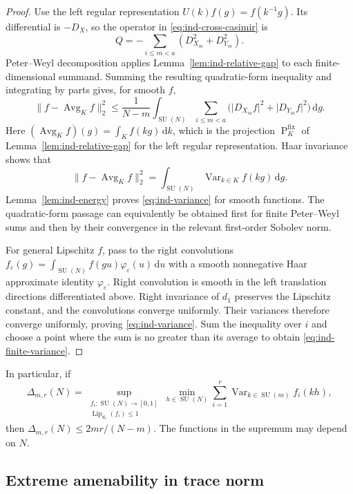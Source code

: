 \begin{proof}
Use the left regular representation $U(k)f(g)=f(k^{-1}g)$.
Its differential is $-D_X$, so the operator in
\eqref{eq:ind-cross-casimir} is
\[
Q=-\sum_{i\le m<a}(D_{X_{ia}}^2+D_{Y_{ia}}^2).
\]
Peter--Weyl decomposition applies Lemma~\ref{lem:ind-relative-gap} to
each finite-dimensional summand. Summing the resulting quadratic-form
inequality and integrating by parts gives, for smooth $f$,
\begin{equation}\label{eq:ind-form-bound}
\lVert f-\operatorname{Avg}_Kf\rVert_2^2\le\frac{1}{N-m}
\int_{\operatorname{SU}(N)}\sum_{i\le m<a}
\bigl(\lvert D_{X_{ia}}f\rvert^2+\lvert D_{Y_{ia}}f\rvert^2\bigr)\,\mathrm d g.
\end{equation}
Here $(\operatorname{Avg}_Kf)(g)=\int_Kf(kg)\,\mathrm d k$, which is the projection
$\operatorname{P}^{\mathrm{fix}}_K$ of Lemma~\ref{lem:ind-relative-gap} for the left regular
representation. Haar invariance shows that
\[
\lVert f-\operatorname{Avg}_Kf\rVert_2^2=\int_{\operatorname{SU}(N)}\operatorname{Var}_{k\in K}f(kg)\,\mathrm d g.
\]
Lemma~\ref{lem:ind-energy} proves \eqref{eq:ind-variance} for smooth functions.
The quadratic-form passage can equivalently be obtained first for
finite Peter--Weyl sums and then by their convergence in the relevant
first-order Sobolev norm.

For general Lipschitz $f$, pass to the right convolutions
$f_\varepsilon(g)=\int_{\operatorname{SU}(N)}f(gu)\varphi_\varepsilon(u)\,\mathrm d u$ with a
smooth nonnegative Haar approximate identity $\varphi_\varepsilon$.
Right convolution is smooth in the left translation directions
differentiated above. Right invariance of $d_1$ preserves the Lipschitz
constant, and the convolutions converge uniformly. Their variances
therefore converge uniformly, proving \eqref{eq:ind-variance}. Sum the
inequality over $i$ and choose a point where the sum is no greater
than its average to obtain \eqref{eq:ind-finite-variance}.
\end{proof}

In particular, if
\[
\Delta_{m,r}(N)=
\sup_{\substack{f_i:\operatorname{SU}(N)\to[0,1]\\\operatorname{Lip}_{d_1}(f_i)\le1}}
\min_{h\in\operatorname{SU}(N)}\sum_{i=1}^r\operatorname{Var}_{k\in\operatorname{SU}(m)}f_i(kh),
\]
then $\Delta_{m,r}(N)\le2mr/(N-m)$. The functions in the supremum
may depend on $N$.


\subsection{Extreme amenability in trace norm}\label{sec:ind-trace-ea}

